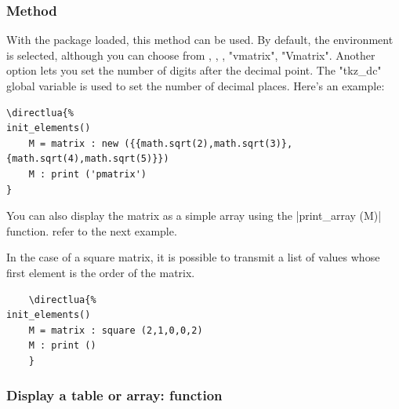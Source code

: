 
\subsubsection{Method  } %
\label{ssub:method_print}

With the  package loaded, this method can be used. By default, the  environment is selected, although you can choose from , , , "vmatrix", "Vmatrix". Another option lets you set the number of digits after the decimal point. The "tkz\_dc" global variable is used to set the number of decimal places. Here's an example:

\vspace{.5em}
\begin{Verbatim}
\directlua{%
init_elements()
    M = matrix : new ({{math.sqrt(2),math.sqrt(3)},{math.sqrt(4),math.sqrt(5)}})
    M : print ('pmatrix')
}
\end{Verbatim}



\vspace{.5em}
You can also display the matrix as a simple array using the |print_array (M)| function. refer to the next example. 

In the case of a square matrix, it is possible to transmit a list of values whose first element is the order of the matrix.

\vspace{.5em}
\begin{minipage}{.5\textwidth}
  \begin{Verbatim}
    \directlua{%
init_elements()
    M = matrix : square (2,1,0,0,2)
    M : print () 
    }
  \end{Verbatim}
\end{minipage}
\begin{minipage}{.5\textwidth}
\end{minipage}

\subsubsection{Display a table or array: function } %
\label{ssub:display_a_table_or_array_function_code_print_array}


